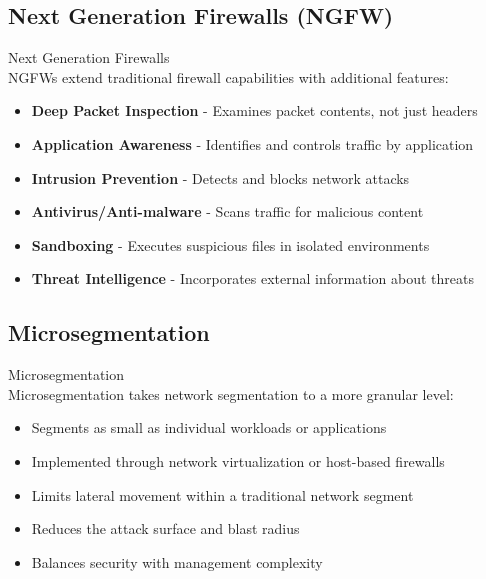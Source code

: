 \subsection{Next Generation Firewalls (NGFW)}

\begin{definition}{Next Generation Firewalls}\\
NGFWs extend traditional firewall capabilities with additional features:
\begin{itemize}
    \item \textbf{Deep Packet Inspection} - Examines packet contents, not just headers
    \item \textbf{Application Awareness} - Identifies and controls traffic by application
    \item \textbf{Intrusion Prevention} - Detects and blocks network attacks
    \item \textbf{Antivirus/Anti-malware} - Scans traffic for malicious content
    \item \textbf{Sandboxing} - Executes suspicious files in isolated environments
    \item \textbf{Threat Intelligence} - Incorporates external information about threats
\end{itemize}
\end{definition}

\subsection{Microsegmentation}

\begin{definition}{Microsegmentation}\\
Microsegmentation takes network segmentation to a more granular level:
\begin{itemize}
    \item Segments as small as individual workloads or applications
    \item Implemented through network virtualization or host-based firewalls
    \item Limits lateral movement within a traditional network segment
    \item Reduces the attack surface and blast radius
    \item Balances security with management complexity
\end{itemize}
\end{definition}

